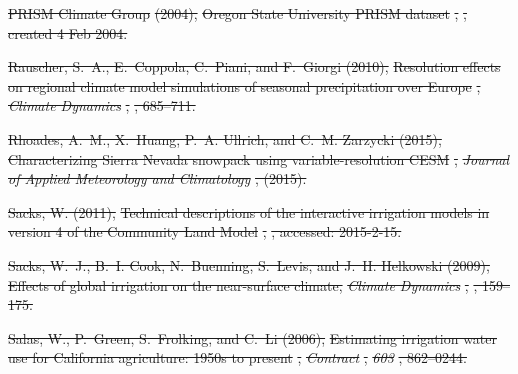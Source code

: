 \documentclass[draft,ms]{agutex}   %
\providecommand{\DIFdel}[1]{{\protect\color{red}\sout{#1}}}                      %
\begin{document}
\begin{article}
\DIFdel{PRISM Climate Group}%
\DIFdel{(2004), }%
\DIFdel{Oregon State University PRISM dataset}%
\DIFdel{,
  }%
\DIFdel{, created 4 Feb 2004.
}%

\DIFdel{Rauscher, S.~A., E.~Coppola, C.~Piani, and F.~Giorgi (2010), }%
\DIFdel{Resolution
  effects on regional climate model simulations of seasonal precipitation over
  Europe}%
\DIFdel{, }\textit{\DIFdel{Climate Dynamics}}%
\DIFdel{, }%
\DIFdel{, 685--711.
}%

\DIFdel{Rhoades, A.~M., X.~Huang, P.~A. Ullrich, and C.~M. Zarzycki (2015),
  }%
\DIFdel{Characterizing Sierra Nevada snowpack using variable-resolution CESM}%
\DIFdel{,
  }\textit{\DIFdel{Journal of Applied Meteorology and Climatology}}%
\DIFdel{, (2015).
}%

\DIFdel{Sacks, W. (2011), }%
\DIFdel{Technical descriptions of the interactive irrigation models
  in version 4 of the Community Land Model}%
\DIFdel{,
  }%
\DIFdel{, accessed: 2015-2-15.
}%

\DIFdel{Sacks, W.~J., B.~I. Cook, N.~Buenning, S.~Levis, and J.~H. Helkowski (2009),
  Effects of global irrigation on the near-surface climate, }\textit{\DIFdel{Climate
  Dynamics}}%
\DIFdel{, }%
\DIFdel{, 159--175.
}%

\DIFdel{Salas, W., P.~Green, S.~Frolking, and C.~Li (2006), }%
\DIFdel{Estimating irrigation
  water use for California agriculture: 1950s to present}%
\DIFdel{, }\textit{\DIFdel{Contract}}%
\DIFdel{,
  }\textit{\DIFdel{603}}%
\DIFdel{, 862--0244.
}%


\end{article}
\end{document}
